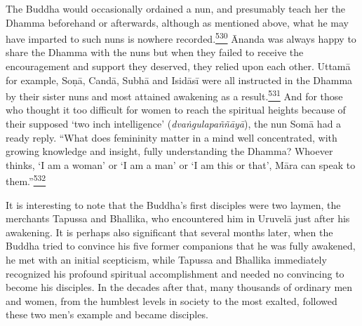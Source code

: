 The Buddha would occasionally ordained a nun, and presumably teach her
the Dhamma beforehand or afterwards, although as mentioned above, what
he may have imparted to such nuns is nowhere
recorded.\label{footprints_split_014.html_fnref530}\hyperref[footprints_split_025.htmlux5cux23fn530]{\textsuperscript{530}}
Ānanda was always happy to share the Dhamma with the nuns but when they
failed to receive the encouragement and support they deserved, they
relied upon each other. Uttamā for example, Soṇā, Candā, Subhā and
Isidāsī were all instructed in the Dhamma by their sister nuns and most
attained awakening as a
result.\label{footprints_split_014.html_fnref531}\hyperref[footprints_split_025.htmlux5cux23fn531]{\textsuperscript{531}}
And for those who thought it too difficult for women to reach the
spiritual heights because of their supposed `two inch intelligence'
(\emph{dvaṅgulapaññāyā}), the nun Somā had a ready reply. ``What does
femininity matter in a mind well concentrated, with growing knowledge
and insight, fully understanding the Dhamma? Whoever thinks, `I am a
woman' or `I am a man' or `I am this or that', Māra can speak to
them.''\label{footprints_split_014.html_fnref532}\hyperref[footprints_split_025.htmlux5cux23fn532]{\textsuperscript{532}}

It is interesting to note that the Buddha's first disciples were two
laymen, the merchants Tapussa and Bhallika, who encountered him in
Uruvelā just after his awakening. It is perhaps also significant that
several months later, when the Buddha tried to convince his five former
companions that he was fully awakened, he met with an initial
scepticism, while Tapussa and Bhallika immediately recognized his
profound spiritual accomplishment and needed no convincing to become his
disciples. In the decades after that, many thousands of ordinary men and
women, from the humblest levels in society to the most exalted, followed
these two men's example and became disciples.


